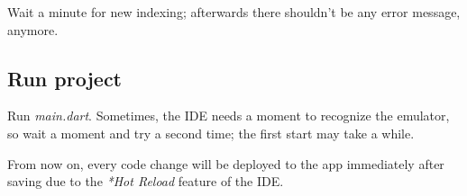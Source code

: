 Wait a minute for new indexing; afterwards there shouldn't be any error message, anymore.

\subsection{Run project}
Run \emph{main.dart}. Sometimes, the IDE needs a moment to recognize the emulator, so wait a moment and try a second time; the first start may take a while.

From now on, every code change will be deployed to the app immediately after saving due to the \emph{*Hot Reload} feature of the IDE.


